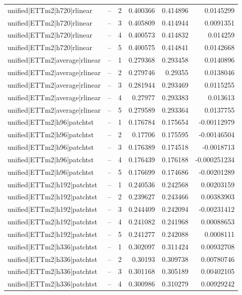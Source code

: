 \begin{longtable}{llrrrr}
unified|ETTm2|h720|rlinear & -- & 2 & 0.400366 & 0.414896 & 0.0145299 \\
unified|ETTm2|h720|rlinear & -- & 3 & 0.405809 & 0.414944 & 0.0091351 \\
unified|ETTm2|h720|rlinear & -- & 4 & 0.400573 & 0.414832 & 0.014259 \\
unified|ETTm2|h720|rlinear & -- & 5 & 0.400575 & 0.414841 & 0.0142668 \\
unified|ETTm2|average|rlinear & -- & 1 & 0.279368 & 0.293458 & 0.0140896 \\
unified|ETTm2|average|rlinear & -- & 2 & 0.279746 & 0.29355 & 0.0138046 \\
unified|ETTm2|average|rlinear & -- & 3 & 0.281944 & 0.293469 & 0.0115255 \\
unified|ETTm2|average|rlinear & -- & 4 & 0.27977 & 0.293383 & 0.013613 \\
unified|ETTm2|average|rlinear & -- & 5 & 0.279589 & 0.293364 & 0.0137755 \\
unified|ETTm2|h96|patchtst & -- & 1 & 0.176784 & 0.175654 & -0.00112979 \\
unified|ETTm2|h96|patchtst & -- & 2 & 0.17706 & 0.175595 & -0.00146504 \\
unified|ETTm2|h96|patchtst & -- & 3 & 0.176389 & 0.174518 & -0.0018713 \\
unified|ETTm2|h96|patchtst & -- & 4 & 0.176439 & 0.176188 & -0.000251234 \\
unified|ETTm2|h96|patchtst & -- & 5 & 0.176699 & 0.174686 & -0.00201289 \\
unified|ETTm2|h192|patchtst & -- & 1 & 0.240536 & 0.242568 & 0.00203159 \\
unified|ETTm2|h192|patchtst & -- & 2 & 0.239627 & 0.243466 & 0.00383903 \\
unified|ETTm2|h192|patchtst & -- & 3 & 0.244409 & 0.242094 & -0.00231412 \\
unified|ETTm2|h192|patchtst & -- & 4 & 0.241082 & 0.241968 & 0.00088653 \\
unified|ETTm2|h192|patchtst & -- & 5 & 0.241277 & 0.242088 & 0.0008111 \\
unified|ETTm2|h336|patchtst & -- & 1 & 0.302097 & 0.311424 & 0.00932708 \\
unified|ETTm2|h336|patchtst & -- & 2 & 0.30193 & 0.309738 & 0.00780746 \\
unified|ETTm2|h336|patchtst & -- & 3 & 0.301168 & 0.305189 & 0.00402105 \\
unified|ETTm2|h336|patchtst & -- & 4 & 0.300986 & 0.310279 & 0.00929242 \\

\end{longtable}
